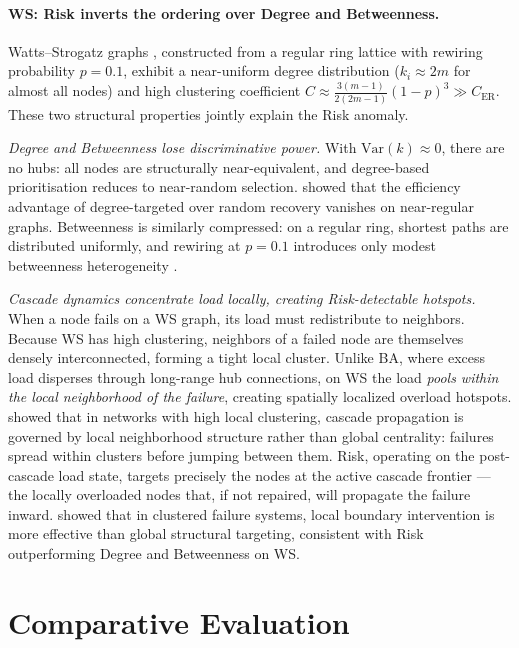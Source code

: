 \documentclass[11pt]{article}
\begin{document}
\paragraph{WS: Risk inverts the ordering over Degree and Betweenness.}
Watts--Strogatz graphs \citep{watts1998collective}, constructed from a
regular ring lattice with rewiring probability $p=0.1$, exhibit a
near-uniform degree distribution ($k_i \approx 2m$ for almost all nodes)
and high clustering coefficient
$C \approx \frac{3(m-1)}{2(2m-1)}(1-p)^3 \gg C_{\mathrm{ER}}$.
These two structural properties jointly explain the Risk anomaly.

\textit{Degree and Betweenness lose discriminative power.}
With $\mathrm{Var}(k)\approx 0$, there are no hubs: all nodes are
structurally near-equivalent, and degree-based prioritisation reduces to
near-random selection.
\citet{holme2002attack} showed that the efficiency advantage of
degree-targeted over random recovery vanishes on near-regular graphs.
Betweenness is similarly compressed: on a regular ring, shortest paths
are distributed uniformly, and rewiring at $p=0.1$ introduces only
modest betweenness heterogeneity \citep{watts1998collective}.

\textit{Cascade dynamics concentrate load locally, creating
Risk-detectable hotspots.}
When a node fails on a WS graph, its load must redistribute to neighbors.
Because WS has high clustering, neighbors of a failed node are themselves
densely interconnected, forming a tight local cluster.
Unlike BA, where excess load disperses through long-range hub connections,
on WS the load \emph{pools within the local neighborhood of the failure},
creating spatially localized overload hotspots.
\citet{buldyrev2010catastrophic} showed that in networks with high local
clustering, cascade propagation is governed by local neighborhood
structure rather than global centrality: failures spread within clusters
before jumping between them.
Risk, operating on the post-cascade load state, targets precisely the
nodes at the active cascade frontier — the locally overloaded nodes that,
if not repaired, will propagate the failure inward.
\citet{majdandzic2014spontaneous} showed that in clustered failure
systems, local boundary intervention is more effective than global
structural targeting, consistent with Risk outperforming Degree and
Betweenness on WS.

\section{Comparative Evaluation}
\label{sec:comparative}
\end{document}
